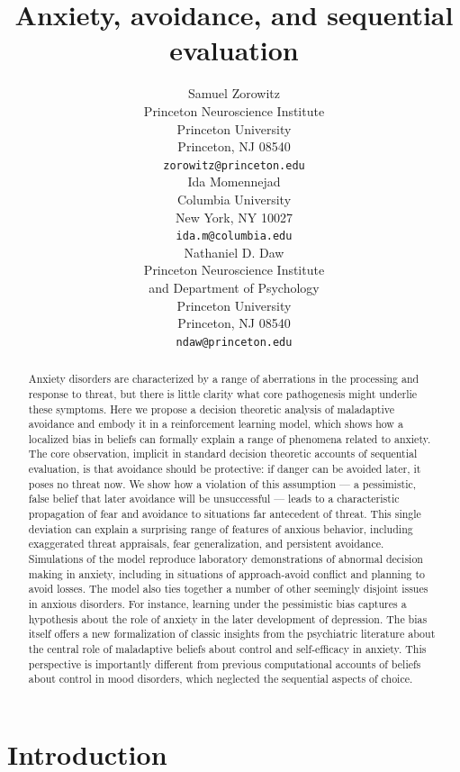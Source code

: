 \documentclass[11pt]{article} %
\title{Anxiety, avoidance, and sequential evaluation}
\author{
Samuel Zorowitz \\
Princeton Neuroscience Institute\\
Princeton University\\
Princeton, NJ 08540 \\
\texttt{zorowitz@princeton.edu} \\
\And
Ida Momennejad \\
Columbia University\\
New York, NY 10027 \\
\texttt{ida.m@columbia.edu} \\
\And
Nathaniel D. Daw \\
Princeton Neuroscience Institute\\
and Department of Psychology\\
Princeton University\\
Princeton, NJ 08540 \\
\texttt{ndaw@princeton.edu} \\
}
\begin{document}
\maketitle

\begin{abstract}
Anxiety disorders are characterized by a range of aberrations in the processing and response to threat, but there is little clarity what core pathogenesis might underlie these symptoms. Here we propose a decision theoretic analysis of maladaptive avoidance and embody it in a reinforcement learning model, which shows how a localized bias in beliefs can formally explain a range of phenomena related to anxiety. The core observation, implicit in standard decision theoretic accounts of sequential evaluation, is that avoidance should be protective: if danger can be avoided later, it poses no threat now. We show how a violation of this assumption --- a pessimistic, false belief that later avoidance will be unsuccessful --- leads to a characteristic propagation of fear and avoidance to situations far antecedent of threat. This single deviation can explain a surprising range of features of anxious behavior, including exaggerated threat appraisals, fear generalization, and persistent avoidance. Simulations of the model reproduce laboratory demonstrations of abnormal decision making in anxiety, including in situations of approach-avoid conflict and planning to avoid losses. The model also ties together a number of other seemingly disjoint issues in anxious disorders. For instance, learning under the pessimistic bias captures a hypothesis about the role of anxiety in the later development of depression. The bias itself offers a new formalization of classic insights from the psychiatric literature about the central role of maladaptive beliefs about control and self-efficacy in anxiety. This perspective is importantly different from previous computational accounts of beliefs about control in mood disorders, which neglected the sequential aspects of choice.
\end{abstract}



\startmain

\section{Introduction}
\end{document}
